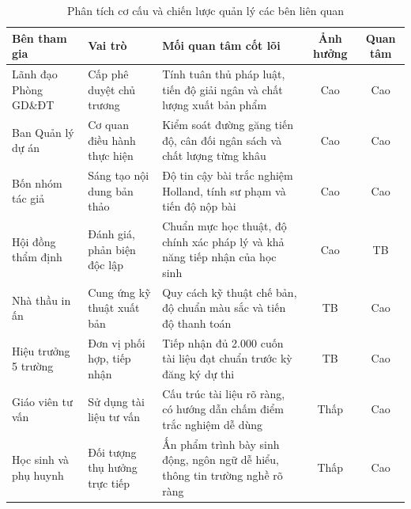 \begin{table}[htbp]
\centering
\caption{Phân tích cơ cấu và chiến lược quản lý các bên liên quan}
\label{tab:cac_ben_lien_quan}
\begin{tabularx}{\textwidth}{L{2.8cm}L{3.2cm}YCC}
\toprule
\textbf{Bên tham gia} & \textbf{Vai trò} & \textbf{Mối quan tâm cốt lõi} & \textbf{Ảnh hưởng} & \textbf{Quan tâm} \\
\midrule
Lãnh đạo Phòng GD\&ĐT & Cấp phê duyệt chủ trương & Tính tuân thủ pháp luật, tiến độ giải ngân và chất lượng xuất bản phẩm & Cao & Cao \\
Ban Quản lý dự án & Cơ quan điều hành thực hiện & Kiểm soát đường găng tiến độ, cân đối ngân sách và chất lượng từng khâu & Cao & Cao \\
Bốn nhóm tác giả & Sáng tạo nội dung bản thảo & Độ tin cậy bài trắc nghiệm Holland, tính sư phạm và tiến độ nộp bài & Cao & Cao \\
Hội đồng thẩm định & Đánh giá, phản biện độc lập & Chuẩn mực học thuật, độ chính xác pháp lý và khả năng tiếp nhận của học sinh & Cao & TB \\
Nhà thầu in ấn & Cung ứng kỹ thuật xuất bản & Quy cách kỹ thuật chế bản, độ chuẩn màu sắc và tiến độ thanh toán & TB & Cao \\
Hiệu trưởng 5 trường & Đơn vị phối hợp, tiếp nhận & Tiếp nhận đủ 2.000 cuốn tài liệu đạt chuẩn trước kỳ đăng ký dự thi & TB & Cao \\
Giáo viên tư vấn & Sử dụng tài liệu tư vấn & Cấu trúc tài liệu rõ ràng, có hướng dẫn chấm điểm trắc nghiệm dễ dùng & Thấp & Cao \\
Học sinh và phụ huynh & Đối tượng thụ hưởng trực tiếp & Ấn phẩm trình bày sinh động, ngôn ngữ dễ hiểu, thông tin trường nghề rõ ràng & Thấp & Cao \\
\bottomrule
\end{tabularx}
\end{table}


